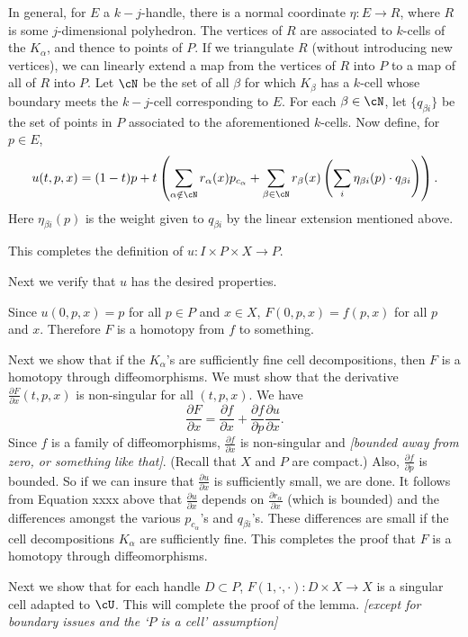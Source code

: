 \documentclass[11pt,leqno]{amsart}
\def\sub{\subset}
\def\pd#1#2{\frac{\partial #1}{\partial #2}}
\def\nn#1{{{\it \small [#1]}}}
\newcommand{\eq}[1]{\begin{displaymath}#1\end{displaymath}}
\begin{document}
In general, for $E$ a $k{-}j$-handle, there is a normal coordinate
$\eta: E \to R$, where $R$ is some $j$-dimensional polyhedron.
The vertices of $R$ are associated to $k$-cells of the $K_\alpha$, and thence to points of $P$.
If we triangulate $R$ (without introducing new vertices), we can linearly extend
a map from the vertices of $R$ into $P$ to a map of all of $R$ into $P$.
Let $\cN$ be the set of all $\beta$ for which $K_\beta$ has a $k$-cell whose boundary meets
the $k{-}j$-cell corresponding to $E$.
For each $\beta \in \cN$, let $\{q_{\beta i}\}$ be the set of points in $P$ associated to the aforementioned $k$-cells.
Now define, for $p \in E$,
\eq{
    u(t, p, x) = (1-t)p + t \left(
            \sum_{\alpha \notin \cN} r_\alpha(x) p_{c_\alpha}
                + \sum_{\beta \in \cN} r_\beta(x) \left( \sum_i \eta_{\beta i}(p) \cdot q_{\beta i} \right)
             \right) .
}
Here $\eta_{\beta i}(p)$ is the weight given to $q_{\beta i}$ by the linear extension
mentioned above.

This completes the definition of $u: I \times P \times X \to P$.

\medskip

Next we verify that $u$ has the desired properties.

Since $u(0, p, x) = p$ for all $p\in P$ and $x\in X$, $F(0, p, x) = f(p, x)$ for all $p$ and $x$.
Therefore $F$ is a homotopy from $f$ to something.

Next we show that if the $K_\alpha$'s are sufficiently fine cell decompositions,
then $F$ is a homotopy through diffeomorphisms.
We must show that the derivative $\pd{F}{x}(t, p, x)$ is non-singular for all $(t, p, x)$.
We have
\eq{
    \pd{F}{x} = \pd{f}{x} + \pd{f}{p} \pd{u}{x} .
}
Since $f$ is a family of diffeomorphisms, $\pd{f}{x}$ is non-singular and
\nn{bounded away from zero, or something like that}.
(Recall that $X$ and $P$ are compact.)
Also, $\pd{f}{p}$ is bounded.
So if we can insure that $\pd{u}{x}$ is sufficiently small, we are done.
It follows from Equation xxxx above that $\pd{u}{x}$ depends on $\pd{r_\alpha}{x}$
(which is bounded)
and the differences amongst the various $p_{c_\alpha}$'s and $q_{\beta i}$'s.
These differences are small if the cell decompositions $K_\alpha$ are sufficiently fine.
This completes the proof that $F$ is a homotopy through diffeomorphisms.

\medskip

Next we show that for each handle $D \sub P$, $F(1, \cdot, \cdot) : D\times X \to X$
is a singular cell adapted to $\cU$.
This will complete the proof of the lemma.
\nn{except for boundary issues and the `$P$ is a cell' assumption}
\end{document}
